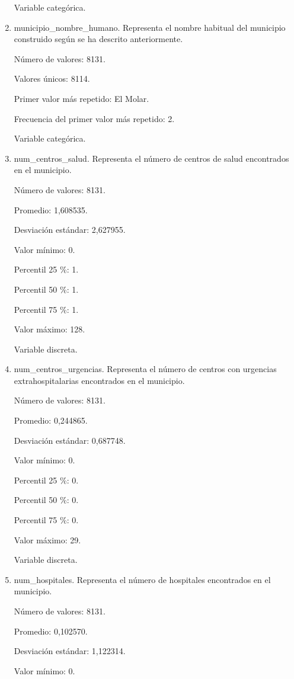 \begin{enumerate}
	Variable categórica.

	\item municipio\_nombre\_humano. Representa el nombre habitual del municipio construido según se ha descrito anteriormente.
	
	Número de valores: 8131.
	
	Valores únicos: 8114.
	
	Primer valor más repetido: El Molar.
	
	Frecuencia del primer valor más repetido: 2.
	
	Variable categórica.

	\item num\_centros\_salud. Representa el número de centros de salud encontrados en el municipio.
	
	Número de valores: 8131.
	
	Promedio: 1,608535.
	
	Desviación estándar: 2,627955.
	
	Valor mínimo: 0.
	
	Percentil 25 \%: 1.
	
	Percentil 50 \%: 1.
	
	Percentil 75 \%: 1.
	
	Valor máximo: 128.
	
	Variable discreta.

	\item num\_centros\_urgencias. Representa el número de centros con urgencias extrahospitalarias encontrados en el municipio.
	
	Número de valores: 8131.
	
	Promedio: 0,244865.
	
	Desviación estándar: 0,687748.
	
	Valor mínimo: 0.
	
	Percentil 25 \%: 0.
	
	Percentil 50 \%: 0.
	
	Percentil 75 \%: 0.
	
	Valor máximo: 29.
	
	Variable discreta.

	\item num\_hospitales. Representa el número de hospitales encontrados en el municipio.
	
	Número de valores: 8131.
	
	Promedio: 0,102570.
	
	Desviación estándar: 1,122314.
	
	Valor mínimo: 0.
	

\end{enumerate}
